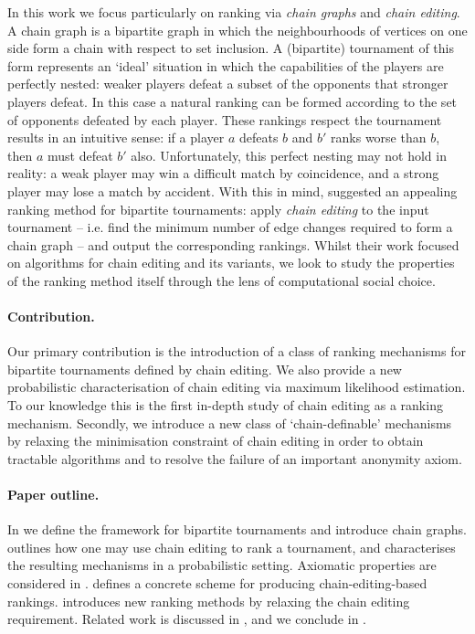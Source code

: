 In this work we focus particularly on ranking via \emph{chain graphs} and
\emph{chain editing}. A chain graph is a bipartite graph in which the
neighbourhoods of vertices on one side form a chain with respect to set
inclusion. A (bipartite) tournament of this form represents an `ideal'
situation in which the capabilities of the players are perfectly nested: weaker
players defeat a subset of the opponents that stronger players defeat. In this
case a natural ranking can be formed according to the set of opponents defeated
by each player. These rankings respect the tournament results in an intuitive
sense: if a player $a$ defeats $b$ and $b'$ ranks worse than $b$, then $a$ must
defeat $b'$ also.
%
Unfortunately, this perfect nesting may not hold in reality: a weak player may
win a difficult match by coincidence, and a strong player may lose a match by
accident.
%
With this in mind, \textcite{jiao2017algorithms} suggested an appealing ranking
method for bipartite tournaments: apply \emph{chain editing} to the input
tournament -- i.e. find the minimum number of edge changes required to form a
chain graph -- and output the corresponding rankings. Whilst their work
focused on algorithms for chain editing and its variants, we look to study the
properties of the ranking method itself through the lens of computational social
choice.

\paragraph{Contribution.} Our primary contribution is the introduction of a
class of ranking mechanisms for bipartite tournaments defined by chain editing.
We also provide a new probabilistic characterisation of chain editing via
maximum likelihood estimation. To our knowledge this is the first in-depth
study of chain editing as a ranking mechanism. Secondly, we introduce a new
class of `chain-definable' mechanisms by relaxing the minimisation constraint
of chain editing in order to obtain tractable algorithms and to resolve the
failure of an important anonymity axiom.

\paragraph{Paper outline.} In  we define the
framework for bipartite tournaments and introduce chain graphs.
 outlines how one may use chain editing to
rank a tournament, and characterises the resulting mechanisms in a
probabilistic setting. Axiomatic properties are considered in
.  defines a
concrete scheme for producing chain-editing-based rankings.
 introduces new ranking methods by relaxing the
chain editing requirement. Related work is discussed in
, and we conclude in .

